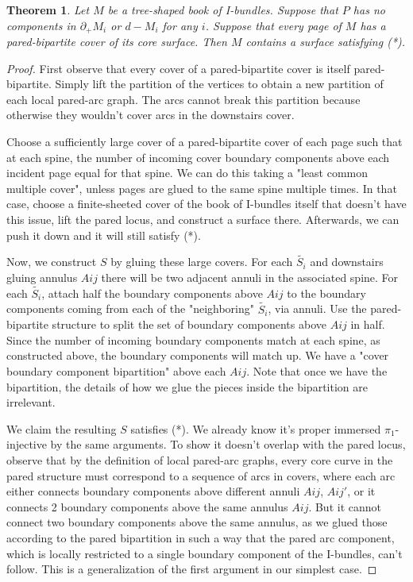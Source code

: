\documentclass[12pt]{amsart}
\newtheorem{thm}[theorem]{Theorem}
\theoremstyle{definition}
\newcommand{\bd}{\partial}
\begin{document}
\begin{thm}

Let $M$ be a tree-shaped book of I-bundles. Suppose that $P$ has no
components in $\bd_+M_i$ or $d-M_i$ for any $i$. Suppose that every page of $M$ has
a pared-bipartite cover of its core surface. Then $M$ contains a surface
satisfying (*).

\end{thm}
\begin{proof}

First observe that every cover of a pared-bipartite cover is itself
pared-bipartite. Simply lift the partition of the vertices to obtain a new
partition of each local pared-arc graph. The arcs cannot break this
partition because otherwise they wouldn't cover arcs in the downstairs cover.

Choose a sufficiently large cover of a pared-bipartite cover of each page such
that at each spine, the number of incoming cover boundary components above each
incident page equal for that spine. We can do this taking a "least common
multiple cover", unless pages are glued to the same spine multiple times. In
that case, choose a finite-sheeted cover of the book of I-bundles itself that
doesn't have this issue, lift the pared locus, and construct a surface there.
Afterwards, we can push it down and it will still satisfy (*).

Now, we construct $S$ by gluing these large covers. For each $\widetilde{S_i}$ and
downstairs gluing annulus $Aij$ there will be two adjacent annuli in the
associated spine. For each $\widetilde{S_i}$, attach half the boundary components above
$Aij$ to the boundary components coming from each of the "neighboring"
$\widetilde{S_i}$,
via annuli. Use the pared-bipartite structure to split the set of boundary
components above $Aij$ in half. Since the number of incoming boundary components
match at each spine, as constructed above, the boundary components will match
up. We have a "cover boundary component bipartition" above each $Aij$. Note that
once we have the bipartition, the details of how we glue the pieces inside the
bipartition are irrelevant.

We claim the resulting $S$ satisfies (*). We already know it's proper immersed
$\pi_1$-injective by the same arguments. To show it doesn't overlap with the pared
locus, observe that by the definition of local pared-arc graphs, every core
curve in the pared structure must correspond to a sequence of arcs in covers,
where each arc either connects boundary components above different annuli $Aij$,
$Aij'$, or it connects 2 boundary components above the same annulus $Aij$. But it
cannot connect two boundary components above the same annulus, as we glued
those according to the pared bipartition in such a way that the pared arc
component, which is locally restricted to a single boundary component of the
I-bundles, can't follow. This is a generalization of the first argument in our
simplest case.


\end{proof}
\end{document}
